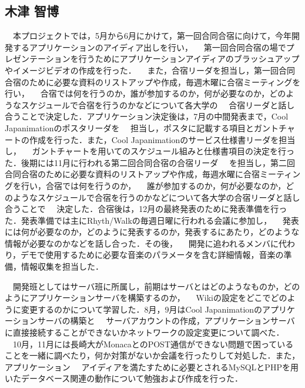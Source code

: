 \subsection{木津 智博}
\par
　本プロジェクトでは，5月から6月にかけて，第一回合同合宿に向けて，今年開発するアプリケーションのアイディア出しを行い，
　第一回合同合宿の場でプレゼンテーションを行うためにアプリケーションアイディアのブラッシュアップやイメージビデオの作成を行った．
　また，合宿リーダを担当し，第一回合同合宿のために必要な資料のリストアップや作成，毎週木曜に合宿ミーティングを行い，
　合宿では何を行うのか，誰が参加するのか，何が必要なのか，どのようなスケジュールで合宿を行うのかなどについて各大学の
　合宿リーダと話し合うことで決定した．アプリケーション決定後は，7月の中間発表まで，Cool Japanimationのポスタリーダを
　担当し，ポスタに記載する項目とガントチャートの作成を行った．また，Cool Japanimationのサービス仕様書リーダを担当し，
　ガントチャートを用いてのスケジュール組みと仕様書項目の決定を行った．後期には11月に行われる第二回合同合宿の合宿リーダ
　を担当し，第二回合同合宿のために必要な資料のリストアップや作成，毎週水曜に合宿ミーティングを行い，合宿では何を行うのか，
　誰が参加するのか，何が必要なのか，どのようなスケジュールで合宿を行うのかなどについて各大学の合宿リーダと話し合うことで
　決定した．合宿後は，12月の最終発表のために発表準備を行った．発表準備では主にRhyth/Walkの毎週日曜に行われる会議に参加し，
　発表には何が必要なのか，どのように発表するのか，発表するにあたり，どのような情報が必要なのかなどを話し合った．その後，
　開発に追われるメンバに代わり，デモで使用するために必要な音楽のパラメータを含む詳細情報，音楽の準備，情報収集を担当した．
\par
　開発班としてはサーバ班に所属し，前期はサーバとはどのようなものか，どのようにアプリケーションサーバを構築するのか，
　Wikiの設定をどこでどのように変更するのかについて学習した．8月，9月はCool Japanimationのアプリケーションサーバの構築と
　サーバアカウントの作成，アプリケーションサーバに直接接続することができないかネットワークの設定変更について調べた．
　10月，11月には長崎大がMonacaとのPOST通信ができない問題で困っていることを一緒に調べたり，何か対策がないか会議を行ったりして対処した．また，アプリケーション
　アイディアを満たすために必要とされるMySQLとPHPを用いたデータベース関連の動作について勉強および作成を行った．
\par

